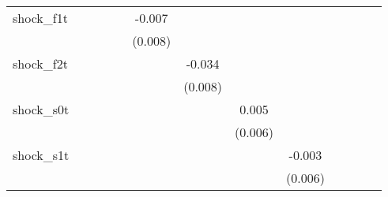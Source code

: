{\begin{tabular}{l*{12}{c}}
\addlinespace
shock\_f1t   &                     &                     &                     &                     &      -0.007         &                     &                     &                     &                     &                     &                     &                     \\
            &                     &                     &                     &                     &     (0.008)         &                     &                     &                     &                     &                     &                     &                     \\
\addlinespace
shock\_f2t   &                     &                     &                     &                     &                     &      -0.034\sym{***}&                     &                     &                     &                     &                     &                     \\
            &                     &                     &                     &                     &                     &     (0.008)         &                     &                     &                     &                     &                     &                     \\
\addlinespace
shock\_s0t   &                     &                     &                     &                     &                     &                     &       0.005         &                     &                     &                     &                     &                     \\
            &                     &                     &                     &                     &                     &                     &     (0.006)         &                     &                     &                     &                     &                     \\
\addlinespace
shock\_s1t   &                     &                     &                     &                     &                     &                     &                     &      -0.003         &                     &                     &                     &                     \\
            &                     &                     &                     &                     &                     &                     &                     &     (0.006)         &                     &                     &                     &                     \\

\end{tabular}}
